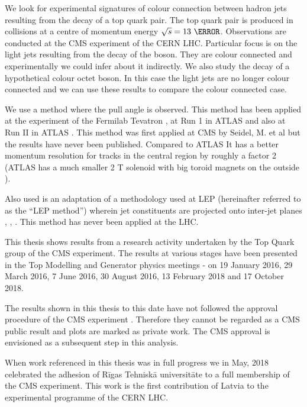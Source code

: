 We look for experimental signatures of colour connection between hadron jets resulting from the decay of a top quark pair. The top quark pair is produced in \Pp\Pp collisions at a centre of momentum energy $\sqrt{s}=13\ \TeV$. Observations are conducted at the CMS experiment of the CERN LHC. Particular focus is on the light jets resulting from the decay of the \PW boson. They are colour connected and experimentally we could infer about it indirectly. We also study the decay of a hypothetical colour octet \PW boson. In this case the light jets are no longer colour connected and we can use these results to compare the colour connected case. 

We use a method where the pull angle \cite{Gallicchio:2010sw} is observed. This method has been applied at the \DZERO experiment of the Fermilab Tevatron \cite{Abazov:2011vh}, at Run 1 in ATLAS \cite{Aad:2015lxa} and also at Run II in ATLAS \cite{Aaboud:2018ibj}. This method was first applied at CMS by Seidel, M. et al \cite{indico:Markus_cf} but the results have never been published. Compared to ATLAS It has a better momentum resolution for tracks in the central region by roughly a factor 2 (ATLAS has a much smaller 2 T solenoid with big toroid magnets on the outside \cite{Aad:2008zzm}).

Also used is an adaptation of a methodology used at LEP (hereinafter referred to as the ``LEP method'') wherein jet constituents are projected onto inter-jet planes \cite{Abbiendi:2005es}, \cite{Abdallah:2006uq}, \cite{Achard:2003pe}. This method has never been applied at the LHC.

This thesis shows results from a research activity undertaken by the Top Quark group of the CMS experiment. The results at various stages have been presented in the Top Modelling and Generator physics meetings - on 19 January 2016, 29 March 2016, 7 June 2016, 30 August 2016, 13 February 2018 and 17 October 2018.

The results shown in this thesis to this date have not followed the approval procedure of the CMS experiment \cite{twiki:PhysicsApprovals}. Therefore they cannot be regarded as a CMS public result and plots are marked as private work. The CMS approval is envisioned as a subsequent step in this analysis.

When work referenced in this thesis was in full progress we in May, 2018 celebrated the adhesion of Rīgas Tehniskā universitāte to a full membership of the CMS experiment. This work is the first contribution of Latvia to the experimental programme of the CERN LHC.
